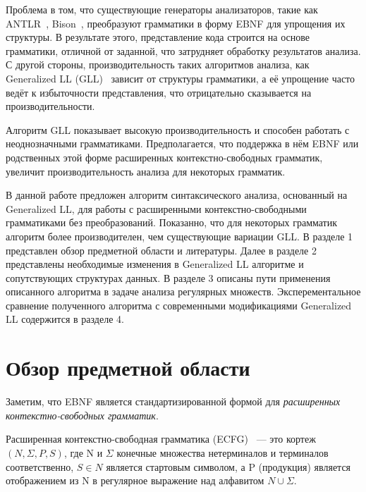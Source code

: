 Проблема в том, что существующие генераторы анализаторов, такие как ANTLR~\cite{ANTLRa}, Bison~\cite{Bison}, преобразуют грамматики в форму EBNF
для упрощения их структуры. В результате этого, представление кода строится на основе грамматики, отличной от заданной,
что затрудняет обработку результатов анализа. С другой стороны, производительность таких алгоритмов анализа,
как Generalized LL (GLL)~\cite{scott2010gll}
зависит от структуры грамматики, а её упрощение часто ведёт к избыточности представления, что отрицательно сказывается на производительности.

Алгоритм GLL показывает высокую производительность и способен работать с неоднозначными грамматиками. 
Предполагается, что поддержка в нём EBNF или родственных этой форме расширенных контекстно-свободных грамматик,
увеличит производительность анализа для некоторых грамматик.

В данной работе предложен алгоритм синтаксического анализа, основанный на Generalized LL, для работы с расширенными
контекстно-свободными грамматиками без преобразований.
Показанно, что для некоторых грамматик алгоритм более производителен, чем существующие вариации GLL.
В разделе 1 представлен обзор предметной области и литературы. Далее в разделе 2 представлены необходимые изменения в Generalized LL алгоритме
и сопутствующих структурах данных. В разделе 3 описаны пути применения описанного алгоритма в задаче анализа регулярных множеств.
Эксперементальное сравнение полученного алгоритма с современными модификациями Generalized LL содержится в разделе 4.

\section{Обзор предметной области}
Заметим, что EBNF 
является стандартизированной формой для \textit{расширенных контекстно-свободных грамматик}.

\begin{mydef}
	Расширенная контекстно-свободная грамматика (ECFG)~\cite{ECFG} --- это кортеж $(N, \Sigma, P, S)$,
	где N и $\Sigma$ конечные множества нетерминалов и терминалов соответственно, 
	$S\in N$ является стартовым символом, а P (продукция) является отображением из N в
	регулярное выражение над алфавитом $N \cup \Sigma$.    
\end{mydef}


